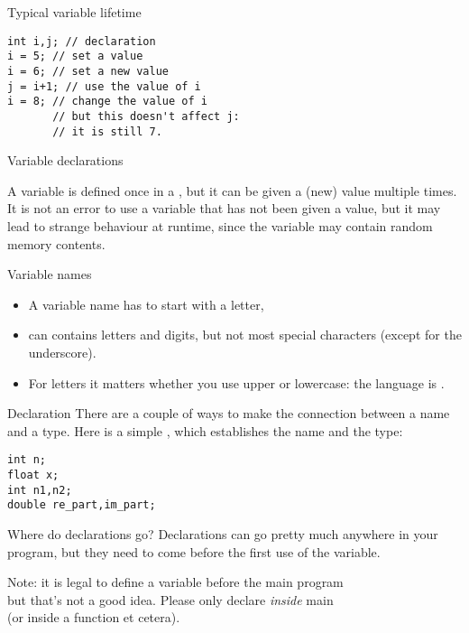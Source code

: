 \begin{block}{Typical variable lifetime}
  \label{sl:varlife}
\begin{verbatim}
int i,j; // declaration
i = 5; // set a value
i = 6; // set a new value
j = i+1; // use the value of i
i = 8; // change the value of i
       // but this doesn't affect j:
       // it is still 7.
\end{verbatim}
\end{block}

 {Variable declarations}

A variable is defined once
in a ,
but it can be given a (new) value multiple
times. It is not an error to use a variable that has not been given a
value, but it may lead to strange behaviour at runtime, since the
variable may contain random memory contents.

\begin{block}{Variable names}
  \label{sl:varname}
  \begin{itemize}
  \item
    A variable name has to start with a letter,
  \item can contains letters and  digits, but not most
    special characters (except for the underscore).
  \item For letters it matters
    whether you use upper or lowercase: the language is .
  \end{itemize}
\end{block}

\begin{block}{Declaration}
  \label{sl:declare-example}
  There are a couple of ways to make the connection between a name and a
  type. Here is a simple
  , which establishes the name
  and the type:
\begin{verbatim}
int n;
float x;
int n1,n2;
double re_part,im_part;
\end{verbatim}
\end{block}

\begin{block}{Where do declarations go?}
  \label{sl:declwhere}
  Declarations can go pretty much anywhere in your program, but they need
  to come before the first use of the variable.

  Note: it is legal to define a variable before the main program\\
  but that's not a good idea. Please only declare \emph{inside} main\\
  (or inside a function et cetera).
\end{block}

